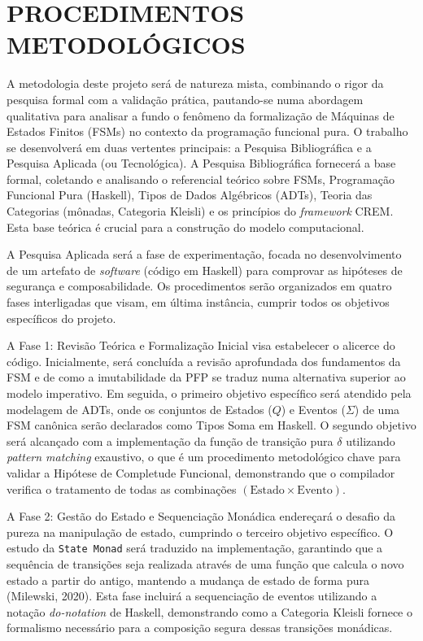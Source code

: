 \documentclass[12pt,a4paper]{article}
\begin{document}
\section{PROCEDIMENTOS METODOLÓGICOS}

A metodologia deste projeto será de natureza mista, combinando o rigor da pesquisa formal com a validação prática, pautando-se numa abordagem qualitativa para analisar a fundo o fenômeno da formalização de Máquinas de Estados Finitos (FSMs) no contexto da programação funcional pura. O trabalho se desenvolverá em duas vertentes principais: a Pesquisa Bibliográfica e a Pesquisa Aplicada (ou Tecnológica). A Pesquisa Bibliográfica fornecerá a base formal, coletando e analisando o referencial teórico sobre FSMs, Programação Funcional Pura (Haskell), Tipos de Dados Algébricos (ADTs), Teoria das Categorias (mônadas, Categoria Kleisli) e os princípios do \textit{framework} CREM. Esta base teórica é crucial para a construção do modelo computacional.

A Pesquisa Aplicada será a fase de experimentação, focada no desenvolvimento de um artefato de \textit{software} (código em Haskell) para comprovar as hipóteses de segurança e composabilidade. Os procedimentos serão organizados em quatro fases interligadas que visam, em última instância, cumprir todos os objetivos específicos do projeto.

A Fase 1: Revisão Teórica e Formalização Inicial visa estabelecer o alicerce do código. Inicialmente, será concluída a revisão aprofundada dos fundamentos da FSM e de como a imutabilidade da PFP se traduz numa alternativa superior ao modelo imperativo. Em seguida, o primeiro objetivo específico será atendido pela modelagem de ADTs, onde os conjuntos de Estados ($Q$) e Eventos ($\Sigma$) de uma FSM canônica serão declarados como Tipos Soma em Haskell. O segundo objetivo será alcançado com a implementação da função de transição pura $\delta$ utilizando \textit{pattern matching} exaustivo, o que é um procedimento metodológico chave para validar a Hipótese de Completude Funcional, demonstrando que o compilador verifica o tratamento de todas as combinações $(\text{Estado} \times \text{Evento})$.

A Fase 2: Gestão do Estado e Sequenciação Monádica endereçará o desafio da pureza na manipulação de estado, cumprindo o terceiro objetivo específico. O estudo da \texttt{State Monad} será traduzido na implementação, garantindo que a sequência de transições seja realizada através de uma função que calcula o novo estado a partir do antigo, mantendo a mudança de estado de forma pura (Milewski, 2020). Esta fase incluirá a sequenciação de eventos utilizando a notação \textit{do-notation} de Haskell, demonstrando como a Categoria Kleisli fornece o formalismo necessário para a composição segura dessas transições monádicas.
\end{document}
